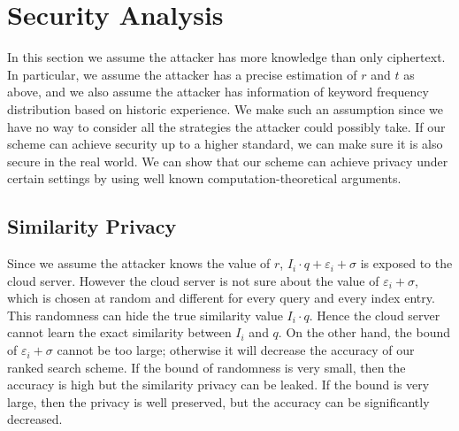 \documentclass{article}
\begin{document}
\section{Security Analysis}
In this section we assume the attacker has more knowledge than only ciphertext. In particular, we assume the attacker has a precise estimation of $r$ and $t$ as above, and we also assume the attacker has information of keyword frequency distribution based on historic experience. We make such an assumption since we have no way to consider all the strategies the attacker could possibly take. If our scheme can achieve security up to a higher standard, we can make sure it is also secure in the real world. We can show that our scheme can achieve privacy under certain settings by using well known computation-theoretical arguments.

\subsection{Similarity Privacy}
Since we assume the attacker knows the value of $r$, $I_i\cdot q+\varepsilon_i+\sigma$ is exposed to the cloud server. However the cloud server is not sure about the value of $\varepsilon_i+\sigma$, which is chosen at random and different for every query and every index entry. This randomness can hide the true similarity value $I_i\cdot q$. Hence the cloud server cannot learn the exact similarity between $I_i$ and $q$. On the other hand, the bound of $\varepsilon_i+\sigma$ cannot be too large; otherwise it will decrease the accuracy of our ranked search scheme. If the bound of randomness is very small, then the accuracy is high but the similarity privacy can be leaked. If the bound is very large, then the privacy is well preserved, but the accuracy can be significantly decreased.
\end{document}
